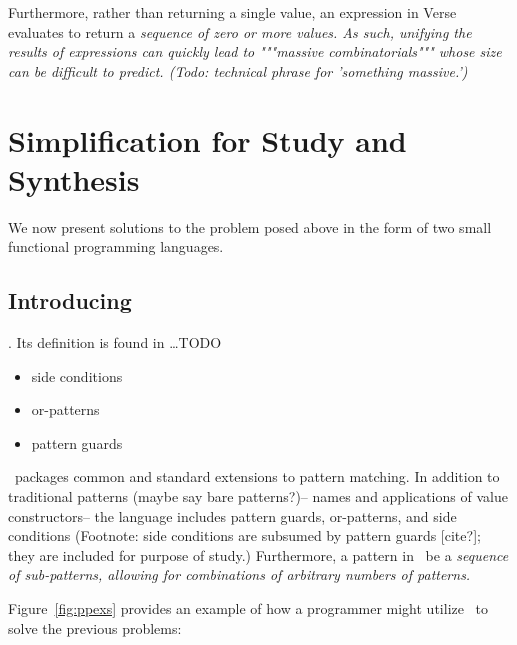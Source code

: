 \documentclass[manuscript,screen,review, 12pt]{acmart}
\begin{document}
    Furthermore, rather than returning a single value, an expression in Verse
    evaluates to return a \it{sequence} of zero or more values. As such,
    unifying the results of expressions can quickly lead to """massive
    combinatorials""" whose size can be difficult to predict. (Todo: technical phrase for 'something massive.') 


    

    

    

    
\section{Simplification for Study and Synthesis}

We now present solutions to the problem posed above in the form of two small
functional programming languages. %

\subsection{Introducing \PPlus\ }


    
    \PPlus. Its definition is found in \dots TODO 
    
    
    \begin{itemize}
        \item side conditions
        \item or-patterns 
        \item pattern guards 
    \end{itemize}

    \PPlus\ packages common and standard extensions to pattern matching. In
    addition to traditional patterns (maybe say bare patterns?)-- names and
    applications of value constructors-- the language includes pattern guards,
    or-patterns, and side conditions (Footnote: side conditions are subsumed by
    pattern guards [cite?]; they are included for purpose of study.)
    Furthermore, a pattern in \PPlus\ be a \it{sequence} of sub-patterns,
    allowing for combinations of arbitrary numbers of patterns. 
    
    

    Figure~\ref{fig:ppexs} provides an example of how a programmer might utilize
    \PPlus\ to solve the previous problems: 
\end{document}
